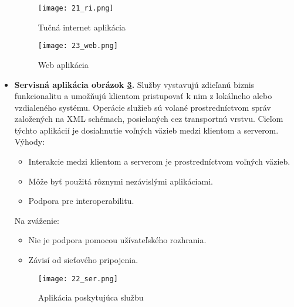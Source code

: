 \begin{itemize}
\begin{figure}[!htbp]
\centering
\texttt{[image: 21\_ri.png]}
\caption{Tučná internet aplikácia \cite{IOT03}}
\label{21_ri}
\end{figure}

\begin{figure}[!htbp]
\centering
\texttt{[image: 23\_web.png]}
\caption{Web aplikácia \cite{IOT03}}
\label{23_web}
\end{figure}

 \item
  \textbf{Servisná aplikácia obrázok \ref{22_ser}.} Služby vystavujú zdieľanú biznis funkcionalitu a umožňujú klientom pristupovať k nim z lokálneho alebo vzdialeného systému. Operácie služieb sú volané prostredníctvom správ založených na XML schémach, posielaných cez transportnú vrstvu. Cieľom týchto aplikácií je dosiahnutie voľných väzieb medzi klientom a serverom. \\
Výhody: 
 \begin{itemize}
   \item Interakcie medzi klientom a serverom je prostredníctvom voľných väzieb.
   \item Môže byť použitá rôznymi nezávislými aplikáciami.
   \item Podpora pre interoperabilitu.
 \end{itemize}
Na zváženie: 
 \begin{itemize}
   \item Nie je podpora pomocou užívateľského rozhrania.
   \item Závisí od sieťového pripojenia.
 \end{itemize} 

\begin{figure}[!htbp]
\centering
\texttt{[image: 22\_ser.png]}
\caption{Aplikácia poskytujúca službu \cite{IOT03}}
\label{22_ser}
\end{figure} 
    
\end{itemize}
